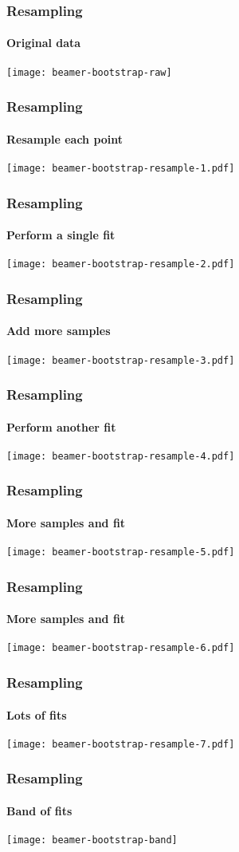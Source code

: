 \documentclass[english, fleqn]{beamer}
\begin{document}
\begin{frame}
    \frametitle{Resampling}
    \framesubtitle{Original data}
    \centering
    \texttt{[image: beamer-bootstrap-raw]}
\end{frame}

\begin{frame}
    \frametitle{Resampling}
    \framesubtitle{Resample each point}
    \centering
    \texttt{[image: beamer-bootstrap-resample-1.pdf]}
\end{frame}

\begin{frame}
    \frametitle{Resampling}
    \framesubtitle{Perform a single fit}
    \centering
    \texttt{[image: beamer-bootstrap-resample-2.pdf]}
\end{frame}

\begin{frame}
    \frametitle{Resampling}
    \framesubtitle{Add more samples}
    \centering
    \texttt{[image: beamer-bootstrap-resample-3.pdf]}
\end{frame}

\begin{frame}
    \frametitle{Resampling}
    \framesubtitle{Perform another fit}
    \centering
    \texttt{[image: beamer-bootstrap-resample-4.pdf]}
\end{frame}

\begin{frame}
    \frametitle{Resampling}
    \framesubtitle{More samples and fit}
    \centering
    \texttt{[image: beamer-bootstrap-resample-5.pdf]}
\end{frame}

\begin{frame}
    \frametitle{Resampling}
    \framesubtitle{More samples and fit}
    \centering
    \texttt{[image: beamer-bootstrap-resample-6.pdf]}
\end{frame}

\begin{frame}
    \frametitle{Resampling}
    \framesubtitle{Lots of fits}
    \centering
    \texttt{[image: beamer-bootstrap-resample-7.pdf]}
\end{frame}

\begin{frame}
    \frametitle{Resampling}
    \framesubtitle{Band of fits}
    \centering
    \texttt{[image: beamer-bootstrap-band]}
\end{frame}
\end{document}

